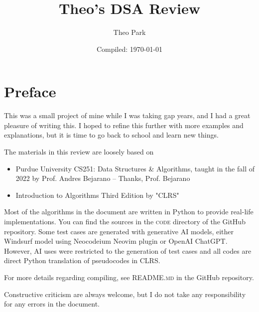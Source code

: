 \documentclass{report}
\title{Theo's DSA Review}
\author{Theo Park}
\date{Compiled: \today}
\begin{document}
\maketitle

\pagestyle{fancy}


\tableofcontents

\chapter*{Preface}

\noindent This was a small project of mine while I was taking gap years, and I had a great pleasure of writing this.
I hoped to refine this further with more examples and explanations, but it is time to go back to school and learn new things.

\noindent The materials in this review are loosely based on

\begin{itemize}
  \item Purdue University CS251: Data Structures \& Algorithms, taught in the fall of 2022 by Prof. Andres Bejarano -- Thanks, Prof. Bejarano
  \item Introduction to Algorithms Third Edition by "CLRS"
\end{itemize}

\noindent Most of the algorithms in the document are written in Python to provide real-life implementations.
You can find the sources in the \textsc{code} directory of the GitHub repository.
Some test cases are generated with generative AI models, either Windsurf model using Neocodeium Neovim plugin or OpenAI ChatGPT.
However, AI uses were restricted to the generation of test cases and all codes are direct Python translation of pseudocodes in CLRS.

\noindent For more details regarding compiling, see \textsc{README.md} in the GitHub repository.

\noindent Constructive criticism are always welcome, but I do not take any responsibility for any errors in the document.
\end{document}
